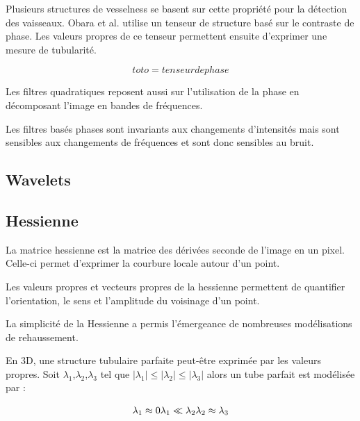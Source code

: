 Plusieurs structures de vesselness se basent sur cette propriété pour la détection des vaisseaux. Obara et al. \cite{Obara2012_phase} utilise un tenseur de structure basé sur le contraste de phase. Les valeurs propres de ce tenseur permettent ensuite d'exprimer une mesure de tubularité.



\begin{equation}
  toto = tenseur de phase
\end{equation}

Les filtres quadratiques reposent aussi sur l'utilisation de la phase en décomposant l'image en bandes de fréquences.

Les filtres basés phases sont invariants aux changements d'intensités mais sont sensibles aux changements de fréquences et sont donc sensibles au bruit.

\subsection{Wavelets}
\label{sec:EA:rehaussement:wavelets}


\subsection{Hessienne}
\label{sec:EA:rehaussement:hessienne}

La matrice hessienne est la matrice des dérivées seconde de l'image en un pixel. Celle-ci permet d'exprimer la courbure locale autour d'un point.

Les valeurs propres et vecteurs propres de la hessienne permettent de quantifier l'orientation, le sens et l'amplitude du voisinage d'un point.

La simplicité de la Hessienne a permis l'émergeance de nombreuses modélisations de rehaussement.

En 3D, une structure tubulaire parfaite peut-être exprimée par les valeurs propres. Soit $\lambda_1$,$\lambda_2$,$\lambda_3$ tel que $|\lambda_1| \leq |\lambda_2| \leq |\lambda_3|$ alors un tube parfait est modélisée par :

\begin{equation}
  \lambda_1 \approx 0 \\
  \lambda_1 \ll \lambda_2 \\
  \lambda_2 \approx \lambda_3
\end{equation}

